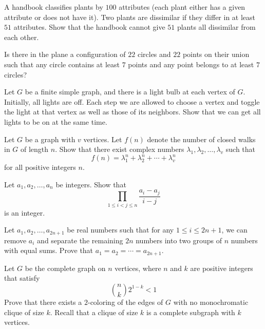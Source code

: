 \documentclass[12pt]{article}
\begin{document}
        \begin{exercise}
            A handbook classifies plants by $100$ attributes (each plant either has a given attribute or does not have it). Two plants are dissimilar if they differ in at least $51$ attributes. Show that the handbook cannot give $51$ plants all dissimilar from each other.
        \end{exercise}
            
        \begin{exercise}
            Is there in the plane a configuration of $22$ circles and $22$ points on their union such that any circle contains at least $7$ points and any point belongs to at least $7$ circles?
        \end{exercise}
            
        \begin{exercise}
            Let $G$ be a finite simple graph, and there is a light bulb at each vertex of $G$. Initially, all lights are off. Each step we are allowed to choose a vertex and toggle the light at that vertex as well as those of its neighbors. Show that we can get all lights to be on at the same time.
        \end{exercise}
            
        \begin{exercise}
            Let $G$ be a graph with $v$ vertices. Let $f(n)$ denote the number of closed walks in $G$ of length $n$. Show that there exist complex numbers $\lambda_1,\lambda_2,\dots,\lambda_v$ such that
            \[f(n)=\lambda_1^n+\lambda_2^n+\cdots +\lambda_v^n\] for all positive integers $n$. 
        \end{exercise}
            
        \begin{exercise}
            Let $a_1,a_2,\dots,a_n$ be integers. Show that
            \[\prod_{1\leq i<j\leq n}\frac{a_i-a_j}{i-j}\] is an integer.
        \end{exercise}
            
        \begin{exercise}
            Let $a_1,a_2,\dots,a_{2n+1}$ be real numbers such that for any $1\leq i \leq 2n+1$, we can remove $a_i$ and separate the remaining $2n$ numbers into two groups of $n$ numbers with equal sums. Prove that $a_1=a_2=\cdots=a_{2n+1}$.
        \end{exercise}

        \begin{exercise}
            Let $G$ be the complete graph on $n$ vertices, where $n$ and $k$ are positive integers that satisfy
            \[\binom{n}{k}2^{1-k}<1
            \] Prove that there exists a $2$-coloring of the edges of $G$ with no monochromatic clique of size $k$. Recall that a clique of size \(k\) is a complete subgraph with \(k\) vertices.
        \end{exercise}
            
\end{document}
